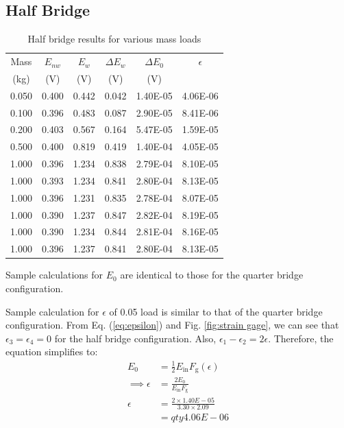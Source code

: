 \subsection{Half Bridge}
\begin{table}
    \centering
    \caption{Half bridge results for various mass loads}
    \label{tab:Q1HalfBridge}
    \begin{tabular}{cccccc}
        \toprule
        Mass & $E_{nw}$ & $E_w$ & $\Delta E_w$ & $\Delta E_0$ & $\epsilon$ \\
        (kg) & (V) & (V) & (V) & (V) & \\
        \midrule
        0.050 & 0.400 & 0.442 & 0.042 & 1.40E-05 & 4.06E-06 \\
        0.100 & 0.396 & 0.483 & 0.087 & 2.90E-05 & 8.41E-06 \\
        0.200 & 0.403 & 0.567 & 0.164 & 5.47E-05 & 1.59E-05 \\
        0.500 & 0.400 & 0.819 & 0.419 & 1.40E-04 & 4.05E-05 \\
        1.000 & 0.396 & 1.234 & 0.838 & 2.79E-04 & 8.10E-05 \\
        1.000 & 0.393 & 1.234 & 0.841 & 2.80E-04 & 8.13E-05 \\
        1.000 & 0.396 & 1.231 & 0.835 & 2.78E-04 & 8.07E-05 \\
        1.000 & 0.390 & 1.237 & 0.847 & 2.82E-04 & 8.19E-05 \\
        1.000 & 0.390 & 1.234 & 0.844 & 2.81E-04 & 8.16E-05 \\
        1.000 & 0.396 & 1.237 & 0.841 & 2.80E-04 & 8.13E-05 \\
        \bottomrule
    \end{tabular}
\end{table}

Sample calculations for $E_0$ are identical to those for the quarter bridge configuration. 

Sample calculation for $\epsilon$ of 0.05 load is similar to that of the quarter bridge configuration. From Eq. (\ref{eq:epsilon}) and 
Fig. \ref{fig:strain gage}, we can see that $\epsilon_3 = \epsilon_4 = 0$ for the half bridge configuration. Also,
$\epsilon_1 - \epsilon_2 = 2 \epsilon$. Therefore, the equation simplifies to:
\begin{align*}
    E_0 &= \frac{1}{2} E_{\text{in}} F_{\text{g}}
    (\epsilon) \\
    \implies \epsilon &= \frac{2 E_0}{E_{\text{in}} F_{\text{g}}} \\
    \epsilon &= \frac{2 \times 1.40E-05}{3.30 \times 2.09} \\
     &= \boxed{qty{4.06E-06}{}}
\end{align*}

